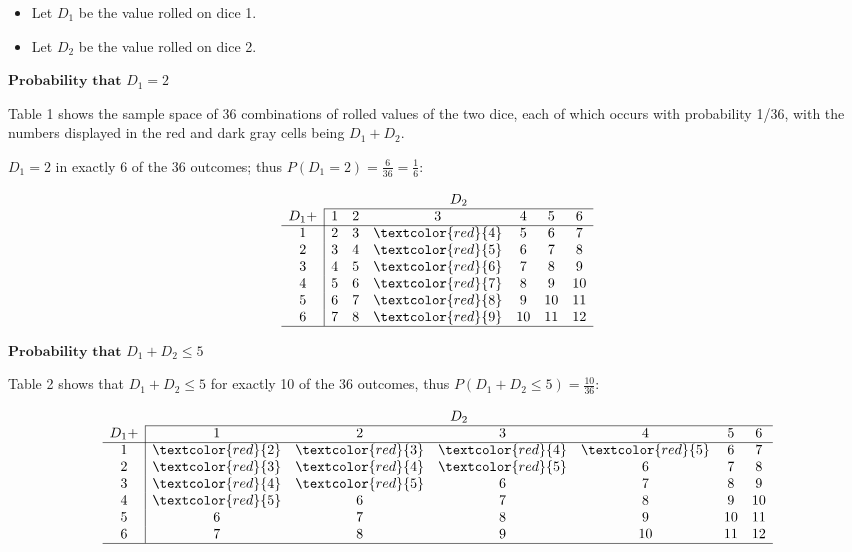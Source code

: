 \begin{itemize}
    \item Let $D _1$ be the value rolled on dice 1.
    \item Let $D _2$ be the value rolled on dice 2.
\end{itemize}

$\textbf{Probability that}$ $D _1 = 2$



Table 1 shows the sample space of 36 combinations of rolled values of the two dice, each
of which occurs with probability 1/36, with the numbers displayed in the red and dark gray
cells being $D _1 + D _2$.



$D _1 = 2$ in exactly 6 of the 36 outcomes; thus $P(D _1 = 2) = \frac{6}{36} = \frac{1}{6}$:



\[
\begin{array}{c|cccccc}
\multicolumn{1}{c}{} & \multicolumn{6}{c}{D_2} \\
\cline{2-7}
D_1 + & 1 & 2 & 3 & 4 & 5 & 6 \\
\cline{1-7}
1 & 2 & 3 & \textcolor{red}{4} & 5 & 6 & 7 \\
2 & 3 & 4 & \textcolor{red}{5} & 6 & 7 & 8 \\
3 & 4 & 5 & \textcolor{red}{6} & 7 & 8 & 9 \\
4 & 5 & 6 & \textcolor{red}{7} & 8 & 9 & 10 \\
5 & 6 & 7 & \textcolor{red}{8} & 9 & 10 & 11 \\
6 & 7 & 8 & \textcolor{red}{9} & 10 & 11 & 12 \\
\cline{1-7}
\end{array}
\]



$\textbf{Probability that}$ $D _1 + D _2 \leq 5$



Table 2 shows that $D _1 + D _2 \leq 5$ for exactly 10 of the 36 outcomes, thus $P(D _1 +
D _2 \leq 5) = \frac{10}{36}$:


\[
\begin{array}{c|cccccc}
\multicolumn{1}{c}{} & \multicolumn{6}{c}{D_2} \\
\cline{2-7}
D_1 + & 1 & 2 & 3 & 4 & 5 & 6 \\
\cline{1-7}
1 & \textcolor{red}{2} & \textcolor{red}{3} & \textcolor{red}{4} & \textcolor{red}{5} & 6 & 7 \\
2 & \textcolor{red}{3} & \textcolor{red}{4} & \textcolor{red}{5} & 6 & 7 & 8 \\
3 & \textcolor{red}{4} & \textcolor{red}{5} & 6 & 7 & 8 & 9 \\
4 & \textcolor{red}{5} & 6 & 7 & 8 & 9 & 10 \\
5 & 6 & 7 & 8 & 9 & 10 & 11 \\
6 & 7 & 8 & 9 & 10 & 11 & 12 \\
\cline{1-7}
\end{array}
\]



